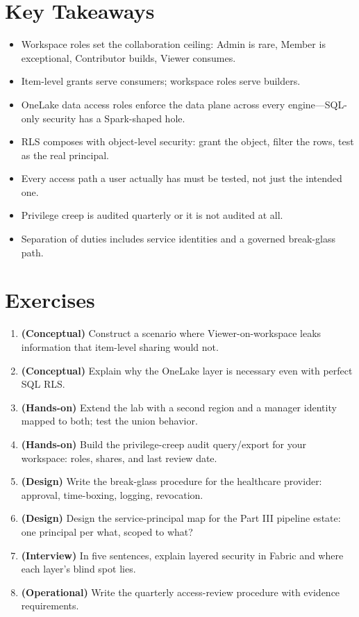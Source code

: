 \section*{Key Takeaways}
\begin{itemize}
    \item Workspace roles set the collaboration ceiling: Admin is rare, Member is exceptional, Contributor builds, Viewer consumes.
    \item Item-level grants serve consumers; workspace roles serve builders.
    \item OneLake data access roles enforce the data plane across every engine---SQL-only security has a Spark-shaped hole.
    \item RLS composes with object-level security: grant the object, filter the rows, test as the real principal.
    \item Every access path a user actually has must be tested, not just the intended one.
    \item Privilege creep is audited quarterly or it is not audited at all.
    \item Separation of duties includes service identities and a governed break-glass path.
\end{itemize}

\section{Exercises}
\begin{enumerate}
    \item \textbf{(Conceptual)} Construct a scenario where Viewer-on-workspace leaks information that item-level sharing would not.
    \item \textbf{(Conceptual)} Explain why the OneLake layer is necessary even with perfect SQL RLS.
    \item \textbf{(Hands-on)} Extend the lab with a second region and a manager identity mapped to both; test the union behavior.
    \item \textbf{(Hands-on)} Build the privilege-creep audit query/export for your workspace: roles, shares, and last review date.
    \item \textbf{(Design)} Write the break-glass procedure for the healthcare provider: approval, time-boxing, logging, revocation.
    \item \textbf{(Design)} Design the service-principal map for the Part III pipeline estate: one principal per what, scoped to what?
    \item \textbf{(Interview)} In five sentences, explain layered security in Fabric and where each layer's blind spot lies.
    \item \textbf{(Operational)} Write the quarterly access-review procedure with evidence requirements.
\end{enumerate}

